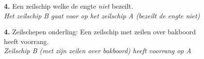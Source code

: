 \begin{figure}[H]
	\centering
	\hspace{0.02\textwidth}
	\begin{minipage}[t]{0.70\textwidth}
		\textbf{4.} Een zeilschip welke de engte \textit{niet} bezeilt.\\
		\textit{Het zeilschip B gaat voor op het zeilschip A (bezeilt de engte niet)}
	\end{minipage}
	\hfill
	\begin{minipage}[t]{0.25\textwidth}
		\label{pic:engte:6}
	\end{minipage}
	\hfill
\end{figure}
\vspace{-0.7cm}
\begin{figure}[H]
	\centering
	\begin{minipage}[t]{0.70\textwidth}
		\textbf{4.} Zeilschepen onderling: Een zeilschip met zeilen over bakboord heeft voorrang.\\
		\textit{Zeilschip B (met zijn zeilen over bakboord) heeft voorrang op A}
	\end{minipage}
	\hfill
	\begin{minipage}[t]{0.25\textwidth}
		\label{pic:tegen:7}
	\end{minipage}
	\hfill
\end{figure}
